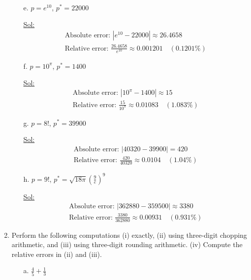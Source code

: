 \begin{enumerate}
\begin{itemize}
    \item[e.] \( p = e^{10} \), \( p^* = 22000 \)

      \underline{Sol:}\\
      \[
        \begin{array}{l}
          \textrm{Absolute error: } \left| e^{10} - 22000 \right|
          \approx 26.4658 \\
          \textrm{Relative error: } \frac{26.4658}{e^{10}} \approx
          0.001201 \quad (0.1201\%)
        \end{array}
      \]
      \bigbreak

    \item[f.] \( p = 10^{\pi} \), \( p^* = 1400 \)

      \underline{Sol:}\\
      \[
        \begin{array}{l}
          \textrm{Absolute error: } \left| 10^{\pi} - 1400 \right| \approx 15 \\
          \textrm{Relative error: } \frac{15}{10^{\pi}} \approx
          0.01083 \quad (1.083\%)
        \end{array}
      \]
      \bigbreak

    \item[g.] \( p = 8! \), \( p^* = 39900 \)

      \underline{Sol:}\\
      \[
        \begin{array}{l}
          \textrm{Absolute error: } \left| 40320 - 39900 \right| = 420 \\
          \textrm{Relative error: } \frac{420}{40320} \approx 0.0104
          \quad (1.04\%)
        \end{array}
      \]
      \bigbreak

    \item[h.] \( p = 9! \), \( p^* = \sqrt{18\pi} \left( \frac{9}{e}
      \right)^9 \)

      \underline{Sol:}\\
      \[
        \begin{array}{l}
          \textrm{Absolute error: } \left| 362880 - 359500 \right|
          \approx 3380 \\
          \textrm{Relative error: } \frac{3380}{362880} \approx
          0.00931 \quad (0.931\%)
        \end{array}
      \]
      \bigbreak
  \end{itemize}

\item Perform the following computations (i) exactly, (ii) using
  three-digit chopping arithmetic, and (iii) using three-digit
  rounding arithmetic. (iv) Compute the relative errors in (ii) and (iii).
  \begin{itemize}
    \item[a.] \( \frac{4}{5} + \frac{1}{3} \)


\end{itemize}
\end{enumerate}
